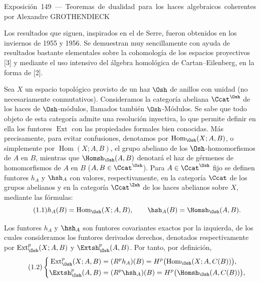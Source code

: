 \unit{Exposición 149 — Teoremas de dualidad para los haces algebraicos coherentes}
%
  {por Alexandre GROTHENDIECK}

Los resultados que siguen, inspirados en el 
de Serre, fueron obtenidos en los inviernos de 1955 y 1956. Se demuestran muy
sencillamente con ayuda de resultados bastante elementales sobre la cohomología de los espacios
proyectivos [3] y mediante el uso intensivo del álgebra homológica de
Cartan--Eilenberg, en la forma de [2].


Sea $X$ un espacio topológico provisto de un haz $\Osh$ de anillos con unidad
(no necesariamente conmutativos). Consideramos la categoría abeliana
$\Ccat^{\Osh}$ de los haces de $\Osh$-módulos, llamados también $\Osh$-Módulos.
Se sabe que todo objeto de esta categoría admite una resolución inyectiva, lo que
permite definir en ella los funtores $\operatorname{Ext}$ con las propiedades
formales bien conocidas. Más precisamente, para evitar confusiones,
denotamos por $\operatorname{Hom}_{\Osh}(X;A,B)$, o simplemente por
$\operatorname{Hom}(X;A,B)$, el grupo abeliano de los $\Osh$-homomorfismos de $A$
en $B$, mientras que $\Homsh_{\Osh}(A,B)$ denotará el haz de gérmenes
de homomorfismos de $A$ en $B$ ($A,B\in\Ccat^{\Osh}$). Para
$A\in\Ccat^{\Osh}$ fijo se definen funtores $h_A$ y $\hsh_A$ con valores, respectivamente,
en la categoría $\Ccat$ de los grupos abelianos y en la categoría
$\Ccat^{\Zsh}$ de los haces abelianos sobre $X$, mediante las fórmulas:
\begin{equation}\tag{1.1}
  h_A(B)=\operatorname{Hom}_{\Osh}(X;A,B),
  \qquad
  \hsh_A(B)=\Homsh_{\Osh}(A,B).
\end{equation}

Los funtores $h_A$ y $\hsh_A$ son funtores covariantes exactos por la izquierda,
de los cuales consideramos los funtores derivados derechos, denotados respectivamente por
$\operatorname{Ext}_{\Osh}^{p}(X;A,B)$ y $\Extsh_{\Osh}^{p}(A,B)$. Por tanto,
por definición,
\begin{equation}\tag{1.2}
\left\{
\begin{aligned}
\operatorname{Ext}_{\Osh}^{p}(X;A,B)
  &= (R^{p}h_A)(B)
   = H^{p}\bigl(\operatorname{Hom}_{\Osh}(X;A,C(B))\bigr),\\
\Extsh_{\Osh}^{p}(A,B)
  &= (R^{p}\hsh_A)(B)
   = H^{p}\bigl(\Homsh_{\Osh}(A,C(B))\bigr),
\end{aligned}
\right.
\end{equation}

